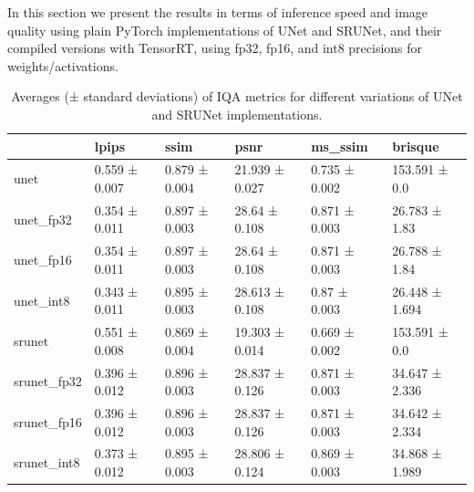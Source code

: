 \label{chap:results}




In this section we present the results in terms of inference speed and image quality using plain PyTorch implementations of UNet and SRUNet, and their compiled versions with TensorRT, using fp32, fp16, and int8 precisions for weights/activations.

\begin{table}[t]
\begin{tabular}{llllll}
\toprule
{} &          lpips &           ssim &            psnr &        ms\_ssim &         brisque \\
\midrule
unet        &  0.559 ± 0.007 &  0.879 ± 0.004 &  21.939 ± 0.027 &  0.735 ± 0.002 &   153.591 ± 0.0 \\
unet\_fp32   &  0.354 ± 0.011 &  0.897 ± 0.003 &   28.64 ± 0.108 &  0.871 ± 0.003 &   26.783 ± 1.83 \\
unet\_fp16   &  0.354 ± 0.011 &  0.897 ± 0.003 &   28.64 ± 0.108 &  0.871 ± 0.003 &   26.788 ± 1.84 \\
unet\_int8   &  0.343 ± 0.011 &  0.895 ± 0.003 &  28.613 ± 0.108 &   0.87 ± 0.003 &  26.448 ± 1.694 \\
srunet      &  0.551 ± 0.008 &  0.869 ± 0.004 &  19.303 ± 0.014 &  0.669 ± 0.002 &   153.591 ± 0.0 \\
srunet\_fp32 &  0.396 ± 0.012 &  0.896 ± 0.003 &  28.837 ± 0.126 &  0.871 ± 0.003 &  34.647 ± 2.336 \\
srunet\_fp16 &  0.396 ± 0.012 &  0.896 ± 0.003 &  28.837 ± 0.126 &  0.871 ± 0.003 &  34.642 ± 2.334 \\
srunet\_int8 &  0.373 ± 0.012 &  0.895 ± 0.003 &  28.806 ± 0.124 &  0.869 ± 0.003 &  34.868 ± 1.989 \\
\bottomrule
\end{tabular}
\caption{Averages (± standard deviations) of IQA metrics for different variations of UNet and SRUNet implementations.}
\label{tab:tab1}
\end{table}

